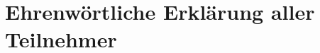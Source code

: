\documentclass[12pt, a4paper, titlepage]{article}\usepackage[]{graphicx}\usepackage[]{color}
\begin{document}

% 


\section{Ehrenwörtliche Erklärung aller Teilnehmer}
\end{document}
